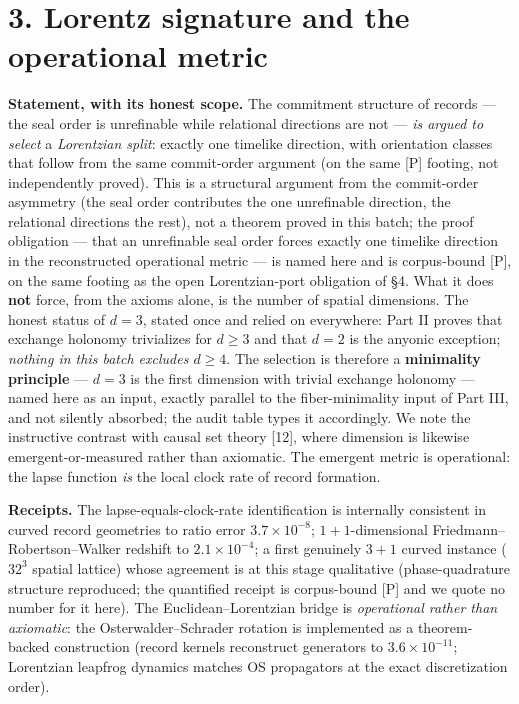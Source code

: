 \documentclass[11pt]{article}
\begin{document}
\section*{3. Lorentz signature and the operational metric}
\textbf{Statement, with its honest scope.}  The commitment structure of records — the seal order is unrefinable while relational directions are not — \emph{is argued to select} a \emph{Lorentzian split}: exactly one timelike direction, with orientation classes that follow from the same commit-order argument (on the same [P] footing, not independently proved).  This is a structural argument from the commit-order asymmetry (the seal order contributes the one unrefinable direction, the relational directions the rest), not a theorem proved in this batch; the proof obligation — that an unrefinable seal order forces exactly one timelike direction in the reconstructed operational metric — is named here and is corpus-bound [P], on the same footing as the open Lorentzian-port obligation of §4. What it does \textbf{not} force, from the axioms alone, is the number of spatial dimensions.  The honest status of $d = 3$, stated once and relied on everywhere: Part II proves that exchange holonomy trivializes for $d \ge 3$ and that $d = 2$ is the anyonic exception; \emph{nothing in this batch excludes $d \ge 4$}.  The selection is therefore a \textbf{minimality principle} — $d = 3$ is the first dimension with trivial exchange holonomy — named here as an input, exactly parallel to the fiber-minimality input of Part III, and not silently absorbed; the audit table types it accordingly.  We note the instructive contrast with causal set theory [12], where dimension is likewise emergent-or-measured rather than axiomatic.  The emergent metric is operational: the lapse function \emph{is} the local clock rate of record formation.

\textbf{Receipts.}  The lapse-equals-clock-rate identification is internally consistent in curved record geometries to ratio error $3.7\times 10^{-8}$; $1{+}1$-dimensional Friedmann–Robertson–Walker redshift to $2.1\times 10^{-4}$; a first genuinely $3{+}1$ curved instance ($32^3$ spatial lattice) whose agreement is at this stage qualitative (phase-quadrature structure reproduced; the quantified receipt is corpus-bound [P] and we quote no number for it here).  The Euclidean–Lorentzian bridge is \emph{operational rather than axiomatic}: the Osterwalder–Schrader rotation is implemented as a theorem-backed construction (record kernels reconstruct generators to $3.6\times 10^{-11}$; Lorentzian leapfrog dynamics matches OS propagators at the exact discretization order).
\end{document}
